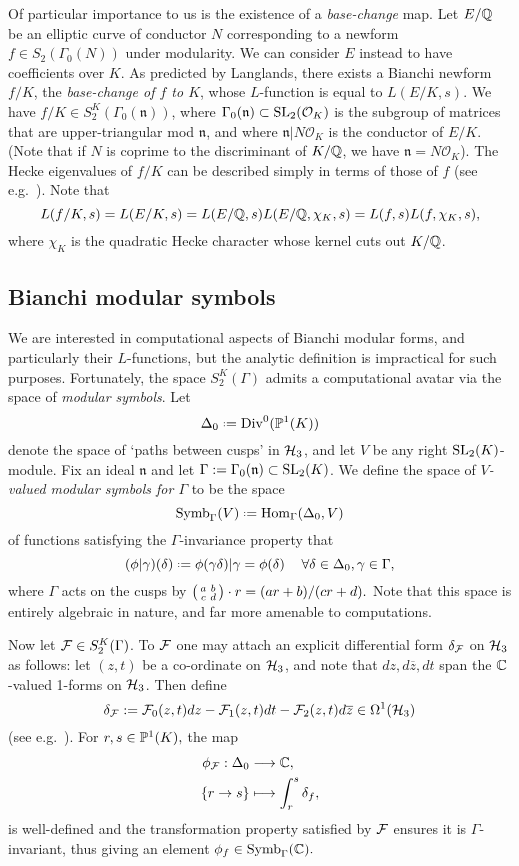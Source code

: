 \documentclass[a4paper,11pt]{article}
\numberwithin{equation}{section}
\newcommand{\fn}{\mathfrak{n}}
\begin{document}
Of particular importance to us is the existence of a \emph{base-change} map. Let $E/\mathbb{Q}$ be an elliptic curve of conductor $N$ corresponding to a newform $f \in S_2(\Gamma_0(N))$ under modularity. We can consider $E$ instead to have coefficients over $K$. As predicted by Langlands, there exists a Bianchi newform $f/K$, the \emph{base-change of $f$ to $K$}, whose $L$-function is equal to $L(E/K,s)$. We have $f/K \in S_2^K(\Gamma_0(\fn))$, where $\Gamma_0(\fn) \subset \SLt(\mathcal{O}_K)$ is the subgroup of matrices that are upper-triangular mod $\fn$, and where $\fn|N\mathcal{O}_K$ is the conductor of $E/K$. (Note that if $N$ is coprime to the discriminant of $K/\mathbb{Q}$, we have $\fn = N\mathcal{O}_K$). The Hecke eigenvalues of $f/K$ can be described simply in terms of those of $f$ (see e.g.\ \cite[\S7.2]{BW18}). Note that
\[
    L(f/K,s) = L(E/K,s) = L(E/\mathbb{Q},s)L(E/\mathbb{Q},\chi_K,s) =  L(f,s)L(f,\chi_K,s),
\]
where $\chi_K$ is the quadratic Hecke character whose kernel cuts out $K/\mathbb{Q}$.




\subsection{Bianchi modular symbols}
We are interested in computational aspects of Bianchi modular forms, and particularly their $L$-functions, but the analytic definition is impractical for such purposes. Fortunately, the space $S_2^K(\Gamma)$ admits a computational avatar via the space of \emph{modular symbols}. Let 
\[
    \Delta_0 \defeq \mathrm{Div}^0(\Proj(K))
\]
denote the space of `paths between cusps' in $\mathcal{H}_3$, and let $V$ be any right $\mathrm{SL}_2(K)$-module. Fix an ideal $\fn$ and let $\Gamma := \Gamma_0(\fn) \subset\SLt(K)$. We define the space of \emph{$V$-valued modular symbols for $\Gamma$} to be the space
\[
    \symb_{\Gamma}(V) \defeq \mathrm{Hom}_\Gamma(\Delta_0,V)
\]
of functions satisfying the $\Gamma$-invariance property that
\[(\phi|\gamma)(\delta)\defeq \phi(\gamma \delta)|\gamma = \phi(\delta)\hspace{12pt} \forall \delta\in\Delta_0, \gamma\in\Gamma,\]
where $\Gamma$ acts on the cusps by $\left(\begin{smallmatrix}a & b\\c & d\end{smallmatrix}\right)\cdot r = (ar+b)/(cr+d).$  Note that this space is entirely algebraic in nature, and far more amenable to computations.

Now let $\mathcal{F} \in S_2^K(\Gamma)$. To $\mathcal{F}$ one may attach an explicit differential form $\delta_{\mathcal{F}}$ on $\mathcal{H}_3$ as follows: let $(z,t)$ be a co-ordinate on $\mathcal{H}_3$, and note that $dz, d\overline{z}, dt$ span the $\mathbb{C}$-valued 1-forms on $\mathcal{H}_3$. Then define
\[
    \delta_{\mathcal{F}} := \mathcal{F}_0(z,t)dz - \mathcal{F}_1(z,t)dt - \mathcal{F}_2(z,t)d\overline{z} \in \Omega^1(\mathcal{H}_3)
\]
(see e.g.\ \cite{CrWh94}). For $r,s \in \mathbb{P}^1(K),$ the map
\begin{align*}
    \phi_{\mathcal{F}} : \Delta_0 &\longrightarrow \mathbb{C},\\
    \{r\to s\} &\longmapsto \int_{r}^s \delta_f,
\end{align*}
is well-defined and the transformation property satisfied by $\mathcal{F}$ ensures it is $\Gamma$-invariant, thus giving an element $\phi_f \in \mathrm{Symb}_\Gamma(\mathbb{C}).$ 
\end{document}
